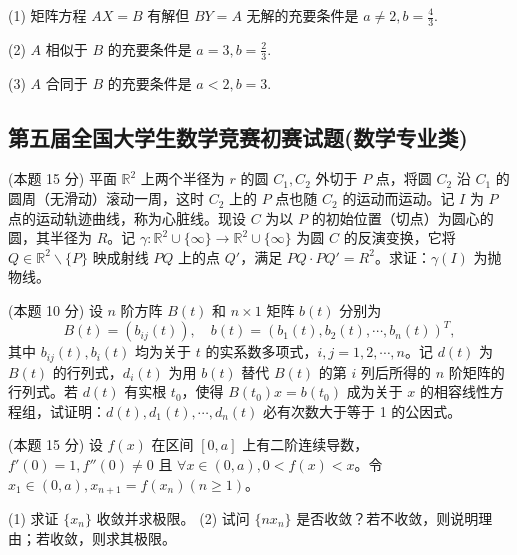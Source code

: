 \documentclass[loose]{ExBook}
\begin{document}
\begin{qitems}
\begin{bbox}
        (1) 矩阵方程 \(AX = B\) 有解但 \(BY = A\) 无解的充要条件是 \(a \neq 2, b = \frac{4}{3}\).

        (2) \(A\) 相似于 \(B\) 的充要条件是 \(a = 3, b = \frac{2}{3}\).

        (3) \(A\) 合同于 \(B\) 的充要条件是 \(a < 2, b = 3\).
    \end{bbox}
\end{qitems}
\subsection{第五届全国大学生数学竞赛初赛试题(数学专业类)}
\begin{qitems}
    \begin{bbox}
        \qitem (本题 15 分) 平面 \(\mathbb{R}^2\) 上两个半径为 \(r\) 的圆 \(C_1, C_2\) 外切于 \(P\) 点，将圆 \(C_2\) 沿 \(C_1\) 的圆周（无滑动）滚动一周，这时 \(C_2\) 上的 \(P\) 点也随 \(C_2\) 的运动而运动。记 \(I\) 为 \(P\) 点的运动轨迹曲线，称为心脏线。现设 \(C\) 为以 \(P\) 的初始位置（切点）为圆心的圆，其半径为 \(R\)。记 \(\gamma : \mathbb{R}^2 \cup \{ \infty \} \rightarrow \mathbb{R}^2 \cup \{ \infty \}\) 为圆 \(C\) 的反演变换，它将 \(Q \in \mathbb{R}^2 \backslash \{ P \}\) 映成射线 \(PQ\) 上的点 \(Q'\)，满足 \(PQ \cdot PQ' = R^2\)。求证：\(\gamma (I)\) 为抛物线。
    \end{bbox}

    \begin{bbox}
        \qitem (本题 10 分) 设 \(n\) 阶方阵 \(B(t)\) 和 \(n \times 1\) 矩阵 \(b(t)\) 分别为
        \[ B(t) = (b_{ij}(t)) , \quad b(t) = (b_1(t), b_2(t), \cdots, b_n(t))^T , \]
        其中 \(b_{ij}(t), b_i(t)\) 均为关于 \(t\) 的实系数多项式，\(i, j = 1, 2, \cdots, n\)。记 \(d(t)\) 为 \(B(t)\) 的行列式，\(d_i(t)\) 为用 \(b(t)\) 替代 \(B(t)\) 的第 \(i\) 列后所得的 \(n\) 阶矩阵的行列式。若 \(d(t)\) 有实根 \(t_0\)，使得 \(B(t_0)x = b(t_0)\) 成为关于 \(x\) 的相容线性方程组，试证明：\(d(t), d_1(t), \cdots, d_n(t)\) 必有次数大于等于 1 的公因式。
    \end{bbox}

    \begin{bbox}
        \qitem (本题 15 分) 设 \(f(x)\) 在区间 \([0, a]\) 上有二阶连续导数，\(f'(0) = 1, f''(0) \neq 0\) 且 \(\forall x \in (0, a), 0 < f(x) < x\)。令 \(x_1 \in (0, a), x_{n+1} = f(x_n) (n \geq 1)\)。
        
        (1) 求证 \(\{x_n\}\) 收敛并求极限。
        (2) 试问 \(\{nx_n\}\) 是否收敛？若不收敛，则说明理由；若收敛，则求其极限。
    \end{bbox}


\end{qitems}
\end{document}
